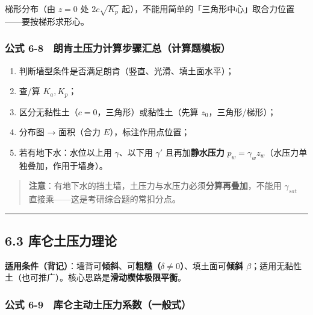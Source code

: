 \documentclass[
]{article}
\providecommand{\tightlist}{%
  \setlength{\itemsep}{0pt}\setlength{\parskip}{0pt}}
\begin{document}
梯形分布（由 \(z=0\) 处 \(2c\sqrt{K_p}\)
起），不能用简单的「三角形中心」取合力位置------要按梯形求形心。

\subsubsection{公式
6-8　朗肯土压力计算步骤汇总（计算题模板）}\label{ux516cux5f0f-6-8-ux6717ux80afux571fux538bux529bux8ba1ux7b97ux6b65ux9aa4ux6c47ux603bux8ba1ux7b97ux9898ux6a21ux677f}

\begin{enumerate}
\def\labelenumi{\arabic{enumi}.}
\tightlist
\item
  判断墙型条件是否满足朗肯（竖直、光滑、填土面水平）；
\item
  查/算 \(K_a,K_p\)；
\item
  区分无黏性土（\(c=0\)，三角形）或黏性土（先算 \(z_0\)，三角形/梯形）；
\item
  分布图 → 面积（合力 \(E\)），标注作用点位置；
\item
  若有地下水：水位以上用 \(\gamma\)、以下用 \(\gamma'\)
  且再加\textbf{静水压力}
  \(p_w=\gamma_w z_w\)（水压力单独叠加，作用于墙身）。
\end{enumerate}

\begin{quote}
\textbf{注意}：有地下水的挡土墙，土压力与水压力必须\textbf{分算再叠加}，不能用
\(\gamma_{sat}\) 直接乘------这是考研综合题的常扣分点。
\end{quote}

\begin{center}\rule{0.5\linewidth}{0.5pt}\end{center}

\subsection{6.3
库仑土压力理论}\label{ux5e93ux4ed1ux571fux538bux529bux7406ux8bba}

\textbf{适用条件（背记）}：墙背可\textbf{倾斜}、可\textbf{粗糙（\(\delta\ne0\)）}、填土面可\textbf{倾斜
\(\beta\)}；适用无黏性土（也可推广）。核心思路是\textbf{滑动楔体极限平衡}。

\subsubsection{公式
6-9　库仑主动土压力系数（一般式）}\label{ux516cux5f0f-6-9-ux5e93ux4ed1ux4e3bux52a8ux571fux538bux529bux7cfbux6570ux4e00ux822cux5f0f}
\end{document}
